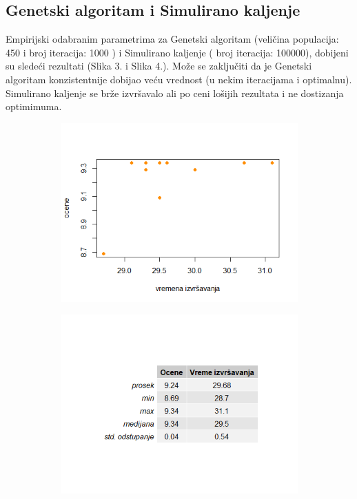 \documentclass[a4paper]{article}
\begin{document}
\subsection{Genetski algoritam i Simulirano kaljenje}

Empirijski odabranim parametrima za Genetski algoritam (veličina populacija: 450 i broj iteracija: 1000 ) i Simulirano kaljenje ( broj iteracija: 100000), dobijeni su sledeći rezultati (Slika 3. i Slika 4.). Može se zaključiti da je Genetski algoritam konzistentnije dobijao veću vrednost (u nekim iteracijama i optimalnu). Simulirano kaljenje se brže izvršavalo ali po ceni lošijih rezultata i ne dostizanja optimimuma.


\begin{figure}[H]
    \centering
    \begin{subfigure}{0.49\textwidth}
    \includegraphics[width = \textwidth]{img/genetski_plot.png}
    \end{subfigure}
    \hfill
    \begin{subfigure}{0.49\textwidth}
    \includegraphics[width = \textwidth]{img/genetski_tabela.png}

\end{subfigure}
\end{figure}
\end{document}
